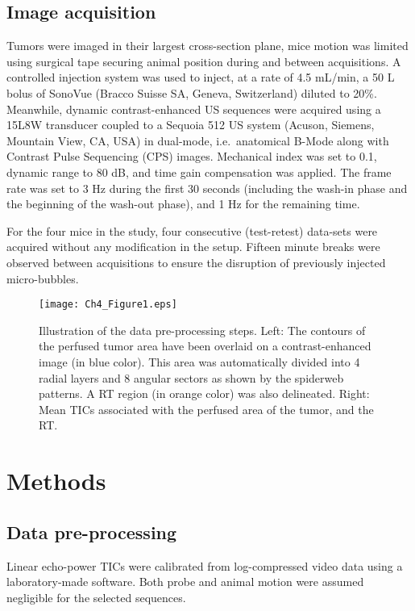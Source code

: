 \subsection{Image acquisition}
Tumors were imaged in their largest cross-section plane, mice motion was limited using surgical tape securing animal position during and between acquisitions. A controlled injection system was used to inject, at a rate of 4.5 mL/min, a 50 \textmu L bolus of SonoVue (Bracco Suisse SA, Geneva, Switzerland) diluted to 20\%.
Meanwhile, dynamic contrast-enhanced US sequences were acquired using a 15L8W transducer coupled to a Sequoia 512 US system (Acuson, Siemens, Mountain View, CA, USA) in dual-mode, i.e.~anatomical B-Mode along with Contrast Pulse Sequencing (CPS) images. Mechanical index was set to 0.1, dynamic range to 80 dB, and time gain compensation was applied. The frame rate was set to 3 Hz during the first 30 seconds (including the wash-in phase and the beginning of the wash-out phase), and 1 Hz for the remaining time.

For the four mice in the study, four consecutive (test-retest) data-sets were acquired without any modification in the setup. Fifteen minute breaks were observed between acquisitions to ensure the disruption of previously injected micro-bubbles.

\begin{figure*}[ht]
  	\centering
  	\texttt{[image: Ch4\_Figure1.eps]}
	\caption{Illustration of the data pre-processing steps. Left: The contours of the perfused tumor area have been overlaid on a contrast-enhanced image (in blue color). This area was automatically divided into 4 radial layers and 8 angular sectors as shown by the spiderweb patterns. A RT region (in orange color) was also delineated. Right: Mean TICs associated with the perfused area of the tumor, and the RT.} 
  	\label{fig:Segmentation}
\end{figure*}
\section{Methods}
\subsection{Data pre-processing}
Linear echo-power TICs were calibrated from log-compressed video data using a laboratory-made software.
Both probe and animal motion were assumed negligible for the selected sequences. 

